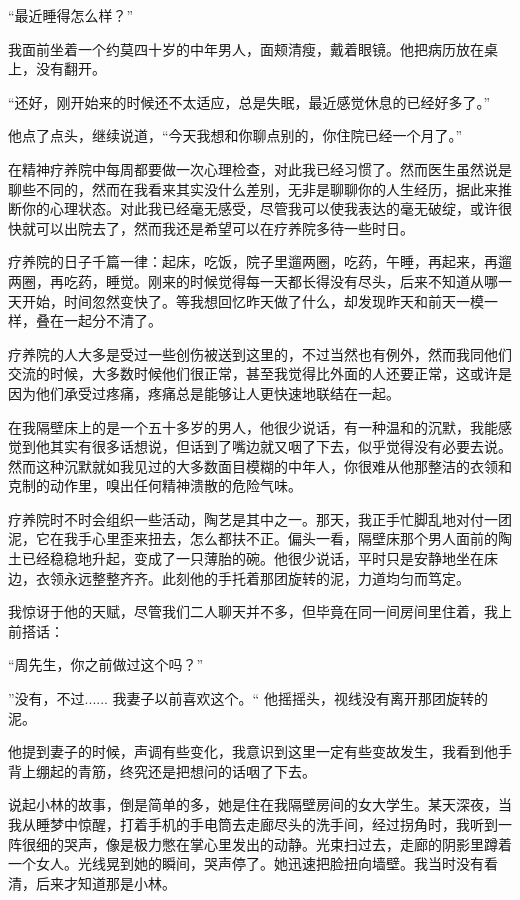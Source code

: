 “最近睡得怎么样？”

我面前坐着一个约莫四十岁的中年男人，面颊清瘦，戴着眼镜。他把病历放在桌上，没有翻开。

“还好，刚开始来的时候还不太适应，总是失眠，最近感觉休息的已经好多了。”

他点了点头，继续说道，“今天我想和你聊点别的，你住院已经一个月了。”

在精神疗养院中每周都要做一次心理检查，对此我已经习惯了。然而医生虽然说是聊些不同的，然而在我看来其实没什么差别，无非是聊聊你的人生经历，据此来推断你的心理状态。对此我已经毫无感受，尽管我可以使我表达的毫无破绽，或许很快就可以出院去了，然而我还是希望可以在疗养院多待一些时日。

疗养院的日子千篇一律：起床，吃饭，院子里遛两圈，吃药，午睡，再起来，再遛两圈，再吃药，睡觉。刚来的时候觉得每一天都长得没有尽头，后来不知道从哪一天开始，时间忽然变快了。等我想回忆昨天做了什么，却发现昨天和前天一模一样，叠在一起分不清了。

疗养院的人大多是受过一些创伤被送到这里的，不过当然也有例外，然而我同他们交流的时候，大多数时候他们很正常，甚至我觉得比外面的人还要正常，这或许是因为他们承受过疼痛，疼痛总是能够让人更快速地联结在一起。

在我隔壁床上的是一个五十多岁的男人，他很少说话，有一种温和的沉默，我能感觉到他其实有很多话想说，但话到了嘴边就又咽了下去，似乎觉得没有必要去说。然而这种沉默就如我见过的大多数面目模糊的中年人，你很难从他那整洁的衣领和克制的动作里，嗅出任何精神溃散的危险气味。

疗养院时不时会组织一些活动，陶艺是其中之一。那天，我正手忙脚乱地对付一团泥，它在我手心里歪来扭去，怎么都扶不正。偏头一看，隔壁床那个男人面前的陶土已经稳稳地升起，变成了一只薄胎的碗。他很少说话，平时只是安静地坐在床边，衣领永远整整齐齐。此刻他的手托着那团旋转的泥，力道均匀而笃定。

我惊讶于他的天赋，尽管我们二人聊天并不多，但毕竟在同一间房间里住着，我上前搭话：

“周先生，你之前做过这个吗？”

”没有，不过...... 我妻子以前喜欢这个。“ 他摇摇头，视线没有离开那团旋转的泥。

他提到妻子的时候，声调有些变化，我意识到这里一定有些变故发生，我看到他手背上绷起的青筋，终究还是把想问的话咽了下去。

说起小林的故事，倒是简单的多，她是住在我隔壁房间的女大学生。某天深夜，当我从睡梦中惊醒，打着手机的手电筒去走廊尽头的洗手间，经过拐角时，我听到一阵很细的哭声，像是极力憋在掌心里发出的动静。光束扫过去，走廊的阴影里蹲着一个女人。光线晃到她的瞬间，哭声停了。她迅速把脸扭向墙壁。我当时没有看清，后来才知道那是小林。

